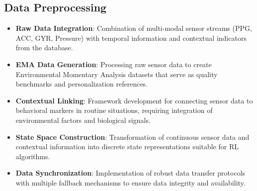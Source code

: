 \subsection*{Data Preprocessing}
\begin{itemize}
    \item \textbf{Raw Data Integration}: Combination of multi-modal sensor streams (PPG, ACC, GYR, Pressure) with temporal information and contextual indicators from the database.
    \item \textbf{EMA Data Generation}: Processing raw sensor data to create Environmental Momentary Analysis datasets that serve as quality benchmarks and personalization references.
    \item \textbf{Contextual Linking}: Framework development for connecting sensor data to behavioral markers in routine situations, requiring integration of environmental factors and biological signals.
    \item \textbf{State Space Construction}: Transformation of continuous sensor data and contextual information into discrete state representations suitable for RL algorithms.
    \item \textbf{Data Synchronization}: Implementation of robust data transfer protocols with multiple fallback mechanisms to ensure data integrity and availability.
\end{itemize}

